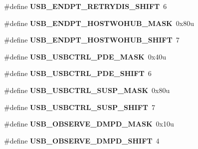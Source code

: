 \begin{DoxyCompactItemize}
\#define {\bfseries U\+S\+B\+\_\+\+E\+N\+D\+P\+T\+\_\+\+R\+E\+T\+R\+Y\+D\+I\+S\+\_\+\+S\+H\+I\+FT}~6
\item 
\mbox{\label{group___u_s_b___register___masks_ga34644591d90c80611273ef5561529c34}} 
\#define {\bfseries U\+S\+B\+\_\+\+E\+N\+D\+P\+T\+\_\+\+H\+O\+S\+T\+W\+O\+H\+U\+B\+\_\+\+M\+A\+SK}~0x80u
\item 
\mbox{\label{group___u_s_b___register___masks_ga3d502bcb3115f9bc7918b5fc67d42337}} 
\#define {\bfseries U\+S\+B\+\_\+\+E\+N\+D\+P\+T\+\_\+\+H\+O\+S\+T\+W\+O\+H\+U\+B\+\_\+\+S\+H\+I\+FT}~7
\item 
\mbox{\label{group___u_s_b___register___masks_ga7fb8345a32022ec5df5129278d1aed30}} 
\#define {\bfseries U\+S\+B\+\_\+\+U\+S\+B\+C\+T\+R\+L\+\_\+\+P\+D\+E\+\_\+\+M\+A\+SK}~0x40u
\item 
\mbox{\label{group___u_s_b___register___masks_gaaf556df66acd4f6ff2bc1f4fad1a05ed}} 
\#define {\bfseries U\+S\+B\+\_\+\+U\+S\+B\+C\+T\+R\+L\+\_\+\+P\+D\+E\+\_\+\+S\+H\+I\+FT}~6
\item 
\mbox{\label{group___u_s_b___register___masks_gac65859ca12bfe997afc67545c8b1a052}} 
\#define {\bfseries U\+S\+B\+\_\+\+U\+S\+B\+C\+T\+R\+L\+\_\+\+S\+U\+S\+P\+\_\+\+M\+A\+SK}~0x80u
\item 
\mbox{\label{group___u_s_b___register___masks_ga44772d68648a57e6341ceec7fd5268f3}} 
\#define {\bfseries U\+S\+B\+\_\+\+U\+S\+B\+C\+T\+R\+L\+\_\+\+S\+U\+S\+P\+\_\+\+S\+H\+I\+FT}~7
\item 
\mbox{\label{group___u_s_b___register___masks_ga796850497f75cc88772d3826d1196a43}} 
\#define {\bfseries U\+S\+B\+\_\+\+O\+B\+S\+E\+R\+V\+E\+\_\+\+D\+M\+P\+D\+\_\+\+M\+A\+SK}~0x10u
\item 
\mbox{\label{group___u_s_b___register___masks_ga044fcfc292ba6db33ec4e847a6510440}} 
\#define {\bfseries U\+S\+B\+\_\+\+O\+B\+S\+E\+R\+V\+E\+\_\+\+D\+M\+P\+D\+\_\+\+S\+H\+I\+FT}~4
\item 

\end{DoxyCompactItemize}
